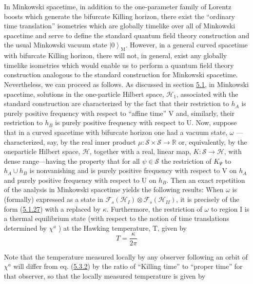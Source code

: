 \documentclass[11pt,a4paper]{article}
\providecommand{\ket}[1]{\left\lvert#1\right\rangle}
\begin{document}
In Minkowski spacetime, in addition to the one-parameter family of Lorentz boosts which generate the bifurcate Killing horizon, there exist the ``ordinary time translation'' isometries which are globally timelike over all of Minkowski spacetime and serve to define the standard quantum field theory construction and the usual Minkowski vacuum state \(\ket{0}_{\mathrm{M}}\). However, in a general curved spacetime with bifurcate Killing horizon, there will not, in general, exist any globally timelike isometries which would enable us to perform a quantum field theory construction analogous to the standard construction for Minkowski spacetime. Nevertheless, we can proceed as follows. As discussed in section \hyperlink{sec:5.1}{5.1}, in Minkowski spacetime, solutions in the one-particle Hilbert space, \(\mathcal{H}_{1}\), associated with the standard construction are characterized by the fact that their restriction to \(h_A\) is purely positive frequency with respect to ``affine time'' V and, similarly, their restriction to \(h_B\) is purely positive frequency with respect to U. Now, suppose that in a curved spacetime with bifurcate horizon one had a vacuum state, \(\omega\) ---characterized, say, by the real inner product \(\mu: \mathcal{S} \times \mathcal{S} \to \mathbb{R}\) or, equivalently, by the oneparticle Hilbert space, \(\mathcal{H}\), together with a real, linear map, \(K: \mathcal{S} \to \mathcal{H}\), with dense range---having the property that for all \(\psi \in \mathcal{S}\) the restriction of \(K_{\Psi}\) to \(h_A \cup h_B\) is nonvanishing and is purely positive frequency with respect to V on \(h_A\) and purely positive frequency with respect to U on \(h_B\). Then an exact repetition of the analysis in Minkowski spacetime yields the following results: When \(\omega\) is (formally) expressed as a state in \(\mathcal{F}_s(\mathcal{H}_I)\otimes \mathcal{F}_s(\mathcal{H}_{II})\), it is precisely of the form (\hyperref[eq:5.1.27]{5.1.27}) with a replaced by \(\kappa\). Furthermore, the restriction of \(\omega\) to region I is a thermal equilibrium state (with respect to the notion of time translations determined by \(\chi^a\) ) at the Hawking temperature, T, given by
\begin{equation*}
T = \frac{\kappa}{2\pi} \tag{5.3.2}\label{eq:5.3.2}
\end{equation*}

Note that the temperature measured locally by any observer following an orbit of \(\chi^a\) will differ from eq. (\hyperref[eq:5.3.2]{5.3.2}) by the ratio of ``Killing time'' to ``proper time'' for that observer, so that the locally measured temperature is given by
\end{document}
